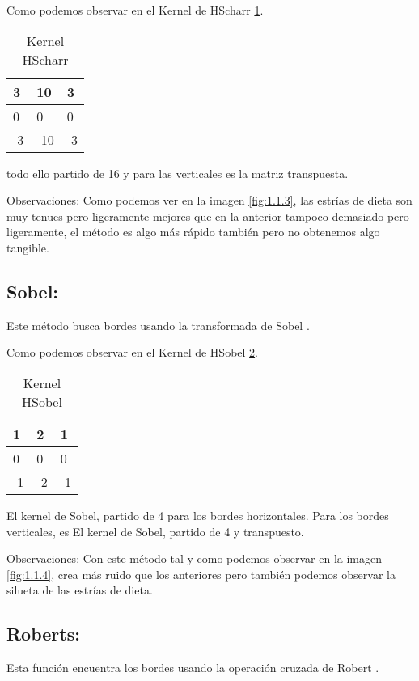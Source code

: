 Como podemos observar en el Kernel de HScharr \ref{F_k3}.
\begin{table}[]
	\centering
	\caption{Kernel HScharr}
	\label{F_k3}
	\begin{tabular}{|l|l|l|}
		\hline
		3  & 10  & 3 \\ \hline
		0  & 0   & 0 \\ \hline
		-3 & -10 & -3 \\ \hline
	\end{tabular}
\end{table}
todo ello partido de 16 y para las verticales es la matriz transpuesta. 




Observaciones:
Como podemos ver en la imagen \ref{fig:1.1.3}, las estrías de dieta son muy tenues pero ligeramente mejores que en la anterior tampoco demasiado pero ligeramente, el método es algo más rápido también pero no obtenemos algo tangible.




\subsection{Sobel:}
Este método busca bordes usando la transformada de Sobel \cite{wiki:Sobel}.


Como podemos observar en el Kernel de HSobel \ref{F_k4}.
\begin{table}[]
	\centering
	\caption{Kernel HSobel}
	\label{F_k4}
	\begin{tabular}{|l|l|l|}
		\hline
		1  & 2  & 1 \\ \hline
		0  & 0  & 0 \\ \hline
		-1 & -2 & -1 \\ \hline
	\end{tabular}
\end{table}

El kernel de Sobel, partido de 4 para los bordes horizontales.
Para los bordes verticales, es El kernel de Sobel, partido de 4 y transpuesto. 

Observaciones: 
Con este método tal y como podemos observar en la imagen \ref{fig:1.1.4}, crea más ruido que los anteriores pero también podemos observar la silueta de las estrías de dieta.


\subsection{Roberts:}

Esta función encuentra los bordes usando la operación cruzada de Robert \cite{wiki:Roberts}.

